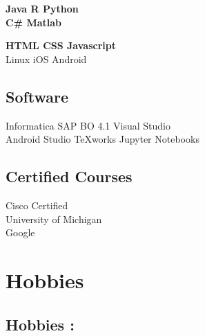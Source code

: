 \documentclass[a4paper]{deedy-resume} %
\begin{document}
\begin{minipage}[t]{0.33\textwidth}
\textbf{Java \textbullet{} R  \textbullet{} Python \\
C\#  \textbullet{} Matlab \\ }

\textbf{HTML \textbullet{} CSS \textbullet{} Javascript\\}
Linux \textbullet{} iOS \textbullet{} Android
\sectionspace
\subsection{Software}
Informatica \textbullet{} SAP BO 4.1 \textbullet{} Visual Studio\\  Android Studio 
\textbullet{} TeXworks \textbullet{} Jupyter Notebooks

\sectionspace
\subsection{Certified Courses}
 \textbullet{} Cisco Certified\\
 \textbullet{} University of Michigan\\
 \textbullet{} Google 
\sectionspace %

\section{Hobbies}
\subsection{Hobbies : }

 \textbullet{} 

 \textbullet{} 

 \textbullet{} 

 \textbullet{} 


\sectionspace %

\end{minipage} %
\hfill
%
%
\end{document}
